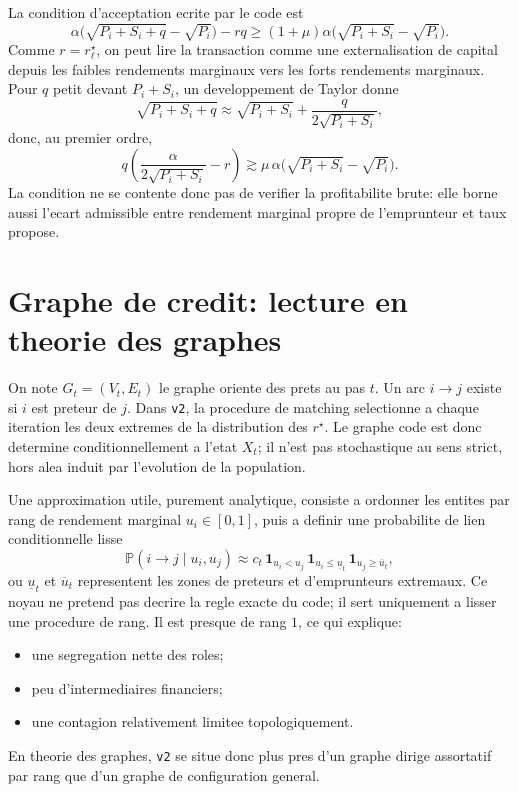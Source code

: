 \documentclass[11pt,a4paper]{article}
\begin{document}
La condition d'acceptation ecrite par le code est
\[
\alpha\big(\sqrt{P_i+S_i+q}-\sqrt{P_i}\big)-rq
\ge
(1+\mu)\alpha\big(\sqrt{P_i+S_i}-\sqrt{P_i}\big).
\]
Comme $r=r^\star_\ell$, on peut lire la transaction comme une externalisation de capital depuis les faibles rendements marginaux vers les forts rendements marginaux. Pour $q$ petit devant $P_i+S_i$, un developpement de Taylor donne
\[
\sqrt{P_i+S_i+q}\approx \sqrt{P_i+S_i} + \frac{q}{2\sqrt{P_i+S_i}},
\]
donc, au premier ordre,
\[
q\left(\frac{\alpha}{2\sqrt{P_i+S_i}}-r\right)
\gtrsim
\mu\,\alpha\big(\sqrt{P_i+S_i}-\sqrt{P_i}\big).
\]
La condition ne se contente donc pas de verifier la profitabilite brute: elle borne aussi l'ecart admissible entre rendement marginal propre de l'emprunteur et taux propose.

\section{Graphe de credit: lecture en theorie des graphes}
On note $G_t=(V_t,E_t)$ le graphe oriente des prets au pas $t$. Un arc $i\to j$ existe si $i$ est preteur de $j$. Dans \texttt{v2}, la procedure de matching selectionne a chaque iteration les deux extremes de la distribution des $r^\star$. Le graphe code est donc determine conditionnellement a l'etat $X_t$; il n'est pas stochastique au sens strict, hors alea induit par l'evolution de la population.

Une approximation utile, purement analytique, consiste a ordonner les entites par rang de rendement marginal $u_i \in [0,1]$, puis a definir une probabilite de lien conditionnelle lisse
\[
\mathbb{P}(i\to j \mid u_i,u_j)
\approx
c_t\,\mathbf{1}_{u_i<u_j}\,\mathbf{1}_{u_i\le \underline{u}_t}\,\mathbf{1}_{u_j\ge \overline{u}_t},
\]
ou $\underline{u}_t$ et $\overline{u}_t$ representent les zones de preteurs et d'emprunteurs extremaux. Ce noyau ne pretend pas decrire la regle exacte du code; il sert uniquement a lisser une procedure de rang. Il est presque de rang $1$, ce qui explique:
\begin{itemize}
\item une segregation nette des roles;
\item peu d'intermediaires financiers;
\item une contagion relativement limitee topologiquement.
\end{itemize}

En theorie des graphes, \texttt{v2} se situe donc plus pres d'un graphe dirige assortatif par rang que d'un graphe de configuration general.
\end{document}
